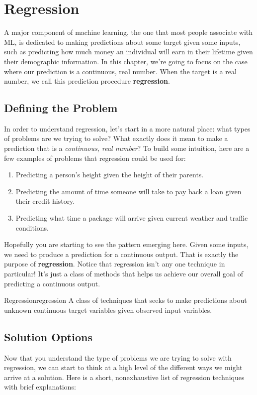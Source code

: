\chapter{Regression}
A major component of machine learning, the one that most people associate with ML, is dedicated to making predictions about some target given some inputs, such as predicting how much money an individual will earn in their lifetime given their demographic information. In this chapter, we're going to focus on the case where our prediction is a continuous, real number. When the target is a real number, we call this prediction procedure \textbf{regression}.

\section{Defining the Problem}
In order to understand regression, let's start in a more natural place: what types of problems are we trying to solve? What exactly does it mean to make a prediction that is a \textit{continuous, real number}? To build some intuition, here are a few examples of problems that regression could be used for:

\begin{enumerate}
    \item Predicting a person's height given the height of their parents.
    \item Predicting the amount of time someone will take to pay back a loan given their credit history.
    \item Predicting what time a package will arrive given current weather and traffic conditions.
\end{enumerate}

Hopefully you are starting to see the pattern emerging here. Given some inputs, we need to produce a prediction for a continuous output. That is exactly the purpose of \textbf{regression}. Notice that regression isn't any one technique in particular! It's just a class of methods that helps us achieve our overall goal of predicting a continuous output.

\begin{definition}{Regression}{regression}
A class of techniques that seeks to make predictions about unknown continuous target variables given observed input variables.
\end{definition}

\section{Solution Options}
Now that you understand the type of problems we are trying to solve with regression, we can start to think at a high level of the different ways we might arrive at a solution. Here is a short, nonexhaustive list of regression techniques with brief explanations:

